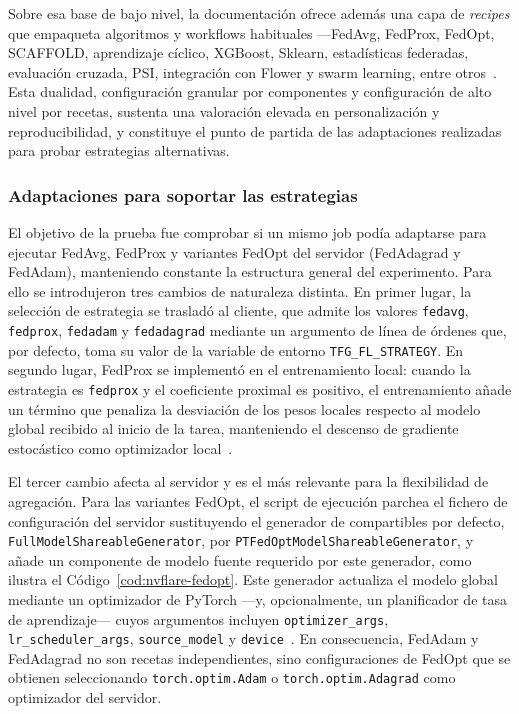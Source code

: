 Sobre esa base de bajo nivel, la documentación ofrece además una capa de
\textit{recipes} que empaqueta algoritmos y workflows habituales —FedAvg, FedProx,
FedOpt, SCAFFOLD, aprendizaje cíclico, XGBoost, Sklearn, estadísticas federadas,
evaluación cruzada, PSI, integración con Flower y swarm learning, entre
otros~\parencite{nvflareRecipes}. Esta dualidad, configuración granular por
componentes y configuración de alto nivel por recetas, sustenta una valoración
elevada en personalización y reproducibilidad, y constituye el punto de partida de
las adaptaciones realizadas para probar estrategias alternativas.

\subsubsection{Adaptaciones para soportar las estrategias}\label{subsec:flex-nvflare-adapt}

El objetivo de la prueba fue comprobar si un mismo job podía adaptarse para
ejecutar FedAvg, FedProx y variantes FedOpt del servidor (FedAdagrad y FedAdam),
manteniendo constante la estructura general del experimento. Para ello se
introdujeron tres cambios de naturaleza distinta. En primer lugar, la selección de
estrategia se trasladó al cliente, que admite los valores \texttt{fedavg},
\texttt{fedprox}, \texttt{fedadam} y \texttt{fedadagrad} mediante un argumento de
línea de órdenes que, por defecto, toma su valor de la variable de entorno
\texttt{TFG\_\allowbreak FL\_\allowbreak STRATEGY}. En segundo lugar, FedProx se implementó en el
entrenamiento local: cuando la estrategia es \texttt{fedprox} y el coeficiente
proximal es positivo, el entrenamiento añade un término que penaliza la desviación
de los pesos locales respecto al modelo global recibido al inicio de la tarea,
manteniendo el descenso de gradiente estocástico como optimizador
local~\parencite{li2020fedprox,nvflareAlgorithms}.

El tercer cambio afecta al servidor y es el más relevante para la flexibilidad de
agregación. Para las variantes FedOpt, el script de ejecución parchea el fichero de
configuración del servidor sustituyendo el generador de compartibles por defecto,
\texttt{FullModelShareableGenerator}, por
\texttt{PTFedOptModelShareableGenerator}, y añade un componente de modelo
fuente requerido por este generador, como ilustra el
Código~\ref{cod:nvflare-fedopt}. Este generador actualiza el modelo global mediante
un optimizador de PyTorch —y, opcionalmente, un planificador de tasa de
aprendizaje— cuyos argumentos incluyen \texttt{optimizer\_\allowbreak args},
\texttt{lr\_\allowbreak scheduler\_\allowbreak args}, \texttt{source\_\allowbreak model} y
\texttt{device}~\parencite{nvflareFedopt}. En consecuencia, FedAdam y FedAdagrad no
son recetas independientes, sino configuraciones de FedOpt que se obtienen
seleccionando \texttt{torch.optim.Adam} o
\texttt{torch.optim.Adagrad} como optimizador del servidor.

